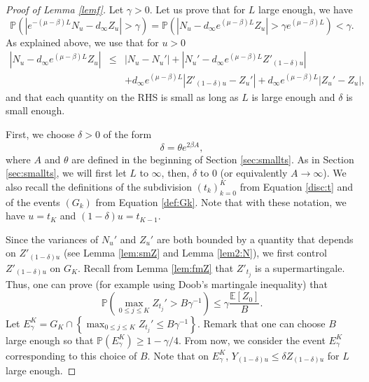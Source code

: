 \documentclass[11pt]{article}
\theoremstyle{plain}
\newcommand\vep{\varepsilon}
\begin{document}
\begin{proof}[Proof of Lemma \ref{lemf}] Let $\gamma>0$. Let us  prove that for $L$ large enough, we have 
\begin{equation*}
\mathbb{P}\left(|e^{-(\mu-\beta)L}N_u-d_\infty Z_u|>\gamma \right)=\mathbb{P}\left(|N_u-d_\infty e^{(\mu-\beta)L} Z_u|>\gamma e^{(\mu-\beta)L}\right)<\gamma.
\end{equation*}
As explained above, we use that for $u>0$  
\begin{eqnarray*}
|N_u-d_\infty e^{(\mu-\beta)L}Z_u|&\leqslant &|N_u-N_u'|+|N_u'-d_\infty e^{(\mu-\beta)L}Z'_{(1-\delta )u}|\\&&+d_\infty e^{(\mu-\beta)L}|Z'_{(1-\delta )u}-Z_{u}'|+d_\infty e^{(\mu-\beta)L}|Z_{u}'-Z_{u}|,
\end{eqnarray*}
and that each quantity on the RHS is small as long as $L$ is large enough and $\delta$ is small enough.


First, we choose $\delta >0$ of the form 
\begin{equation*}
\delta =\theta e^{2\beta A},
\end{equation*}
where $A$ and $\theta$ are defined in the beginning of Section \ref{sec:smallts}. As in Section \ref{sec:smallts}, we will first let $L$ to $\infty$, then, $\delta$ to $0$ (or equivalently $A\to\infty$). We also recall the definitions of the subdivision $(t_k)_{k=0}^K$ from Equation \eqref{disc:t}  and of the events $(G_k)$ from Equation \eqref{def:Gk}. Note that with these notation, we have  $u=t_K$ and $(1-\delta )u=t_{K-1}$.



 Since the variances of $N_u'$ and $Z_u'$ are both bounded by a quantity that depends on $Z'_{(1-\delta) u}$ (see Lemma \ref{lem:smZ} and Lemma \ref{lem2:N}), we first control $Z'_{(1-\delta) u}$ on $G_K$. Recall from Lemma \ref{lem:fmZ} that $Z'_{t_j}$ is a supermartingale. Thus, one can prove (for example using Doob's martingale inequality) that 
 \begin{equation*}
  \mathbb{P}\left(\max_{0\leqslant j\leqslant K} Z_{t_j}'>B\gamma^{-1}  \right)\leqslant \gamma \frac{\mathbb{E}[Z_0]}{B}.
 \end{equation*}
Let $E_{\gamma}^K=G_K\cap \left\{\max_{0\leqslant j\leqslant K} Z_{t_j}'\leqslant B\gamma^{-1} \right\}. $ Remark that one can choose $B$ large enough so that $\mathbb{P}(E_{\gamma}^K)\geqslant 1-\gamma/4$. From now, we consider the event $E_{\gamma}^K$ corresponding to this choice of $B$. Note that on $E_\gamma^K$, 
$Y_{(1-\delta)u}\leqslant \delta Z_{(1-\delta)u}$ for $L$ large enough. 


\end{proof}
\end{document}
